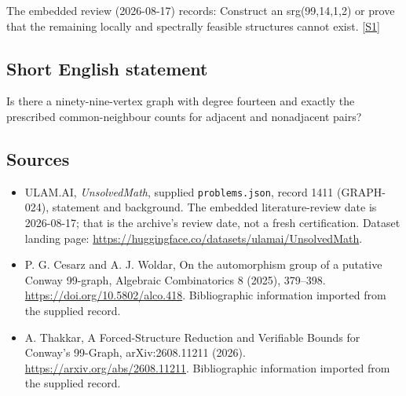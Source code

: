 \documentclass[11pt,a4paper]{article}
\newcommand{\sref}[2]{\hyperlink{source:#1:#2}{[S#2]}}
\begin{document}
The embedded review (2026-08-17) records: Construct an srg(99,14,1,2) or prove that the remaining locally and spectrally feasible structures cannot exist. \sref{1411}{1}

\subsection{Short English statement}

Is there a ninety-nine-vertex graph with degree fourteen and exactly the prescribed common-neighbour counts for adjacent and nonadjacent pairs?

\subsection{Sources}

{\small

\begin{itemize}

\item[\hypertarget{source:1411:1}{S1}] ULAM.AI, \emph{UnsolvedMath}, supplied \texttt{problems.json}, record 1411 (GRAPH-024), statement and background. The embedded literature-review date is 2026-08-17; that is the archive’s review date, not a fresh certification. Dataset landing page: \url{https://huggingface.co/datasets/ulamai/UnsolvedMath}.

\item[\hypertarget{source:1411:2}{S2}] P. G. Cesarz and A. J. Woldar, On the automorphism group of a putative Conway 99-graph, Algebraic Combinatorics 8 (2025), 379–398. \url{https://doi.org/10.5802/alco.418}. Bibliographic information imported from the supplied record.

\item[\hypertarget{source:1411:3}{S3}] A. Thakkar, A Forced-Structure Reduction and Verifiable Bounds for Conway's 99-Graph, arXiv:2608.11211 (2026). \url{https://arxiv.org/abs/2608.11211}. Bibliographic information imported from the supplied record.

\end{itemize}

}

\label{end:1411}
\end{document}
